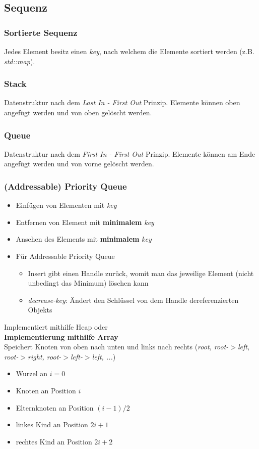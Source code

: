 \subsection{Sequenz}
\subsubsection{Sortierte Sequenz}
Jedes Element besitz einen \textit{key}, nach welchem die Elemente sortiert werden (z.B. \textit{std::map}).

\subsubsection{Stack}
Datenstruktur nach dem \textit{Last In - First Out} Prinzip.
Elemente können oben angefügt werden und von oben gelöscht werden.

\subsubsection{Queue}
Datenstruktur nach dem \textit{First In - First Out} Prinzip.
Elemente können am Ende angefügt werden und von vorne gelöscht werden.

\subsubsection{(Addressable) Priority Queue}
\begin{itemize}
    \item Einfügen von Elementen mit \textit{key}
    \item Entfernen von Element mit \textbf{minimalem} \textit{key}
    \item Ansehen des Elements mit \textbf{minimalem} \textit{key}
    \item Für Addressable Priority Queue
          \begin{itemize}
              \item Insert gibt einen Handle zurück, womit man das jeweilige Element (nicht unbedingt das Minimum) löschen kann
              \item \textit{decrease-key}: Ändert den Schlüssel von dem Handle dereferenzierten Objekts
          \end{itemize}
\end{itemize}
Implementiert mithilfe Heap oder \\
\textbf{Implementierung mithilfe Array} \\
Speichert Knoten von oben nach unten und links nach rechts (\textit{root, root-$>$left, root-$>$right, root-$>$left-$>$left, ...})
\begin{itemize}
    \item Wurzel an $i=0$
    \item Knoten an Position $i$
    \item Elternknoten an Position $(i-1)/2$
    \item linkes Kind an Position $2i+1$
    \item rechtes Kind an Position $2i+2$
\end{itemize}
